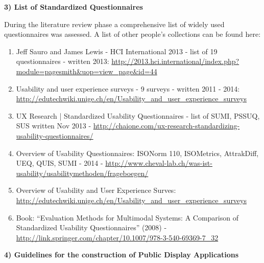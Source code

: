 	\textbf{3) List of Standardized Questionnaires}

		During the literature review phase a comprehensive list of widely used questionnaires was assessed. A list of other people's collections can be found here:

		\begin{enumerate}

		\item Jeff Sauro and James Lewis - HCI International 2013 - list of 19 questionnaires - written 2013: \url{http://2013.hci.international/index.php?module=pagesmith&uop=view_page&id=44}

		\item Usability and user experience surveys - 9 surveys	- written 2011 - 2014: \url{http://edutechwiki.unige.ch/en/Usability_and_user_experience_surveys}

		\item UX Research | Standardized Usability Questionnaires - list of SUMI, PSSUQ, SUS	written Nov 2013 - \url {http://chaione.com/ux-research-standardizing-usability-questionnaires/}
		\item Overview of Usability Questionnaires: ISONorm 110, ISOMetrics, AttrakDiff, UEQ, QUIS, SUMI - 2014 - \url{http://www.cheval-lab.ch/was-ist-usability/usabilitymethoden/frageboegen/}

		\item Overview of Usability and User Experience Surves: \url{http://edutechwiki.unige.ch/en/Usability_and_user_experience_surveys}

		\item Book: ``Evaluation Methods for Multimodal Systems: A Comparison of Standardized Usability Questionnaires'' (2008) - \url{http://link.springer.com/chapter/10.1007/978-3-540-69369-7_32}

		\end{enumerate}




	\textbf{4) Guidelines for the construction of Public Display Applications}

